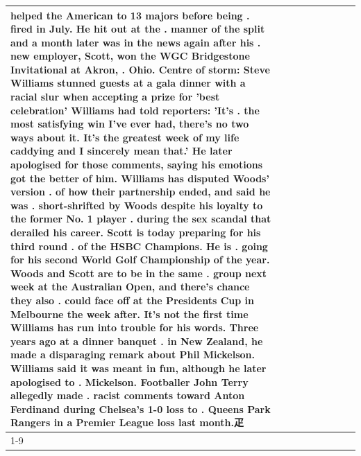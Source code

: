 \begin{table}[H]
\begin{tabular}{lllrlllll}
helped the American to 13 majors before being . fired in July. He hit out at the . manner of the split and a month later was in the news again after his . new employer, Scott, won the WGC Bridgestone Invitational at Akron, . Ohio. Centre of storm: Steve Williams stunned guests at a gala dinner with a racial slur when accepting a prize for 'best celebration' Williams had told reporters: 'It's . the most satisfying win I've ever had, there's no two ways about it. It's the greatest week of my life caddying and I sincerely mean that.' He later apologised for those comments, saying his emotions got the better of him. Williams has disputed Woods' version . of how their partnership ended, and said he was . short-shrifted by Woods despite his loyalty to the former No. 1 player . during the sex scandal that derailed his career. Scott is today preparing for his third round . of the HSBC Champions. He is . going for his second World Golf Championship of the year. Woods and Scott are to be in the same . group next week at the Australian Open, and there's chance they also . could face off at the Presidents Cup in Melbourne the week after. It's not the first time Williams has run into trouble for his words. Three years ago at a dinner banquet . in New Zealand, he made a disparaging remark about Phil Mickelson. Williams said it was meant in fun, although he later apologised to . Mickelson. Footballer John Terry allegedly made . racist comments toward Anton Ferdinand during Chelsea's 1-0 loss to . Queens Park Rangers in a Premier League loss last month.疋 \\
\cline{1-9}

\end{tabular}
\end{table}
